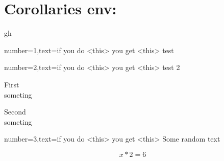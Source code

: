 \documentclass[12pt]{article}
\begin{document}
\newpage
\section{Corollaries env:}



\begin{Corollaries}{}


    gh


    \begin{CorollariesItem}{number=1,text=if you do <this> you get <this>}
        test
    \end{CorollariesItem}


    \begin{CorollariesItem}{number=2,text=if you do <this> you get <this>}
        test 2
    \end{CorollariesItem}


\end{Corollaries}



\begin{Corollaries}{}


    \begin{CorollariesItem}{}
        First\\
        someting
    \end{CorollariesItem}


    \begin{CorollariesItem}{}
        Second\\
        someting
    \end{CorollariesItem}


    \begin{CorollariesItem}{number=3,text=if you do <this> you get <this>}
        Some random text

        \begin{tcbraster}[raster columns=3,raster halign=right]
            \centering
            \begin{tbox}[colorCorollaries][0cm][2pt][10]
                {\large $$ x * 2 = 6 $$}
            \end{tbox}
        \end{tcbraster}
    \end{CorollariesItem}

\end{Corollaries}
\end{document}
